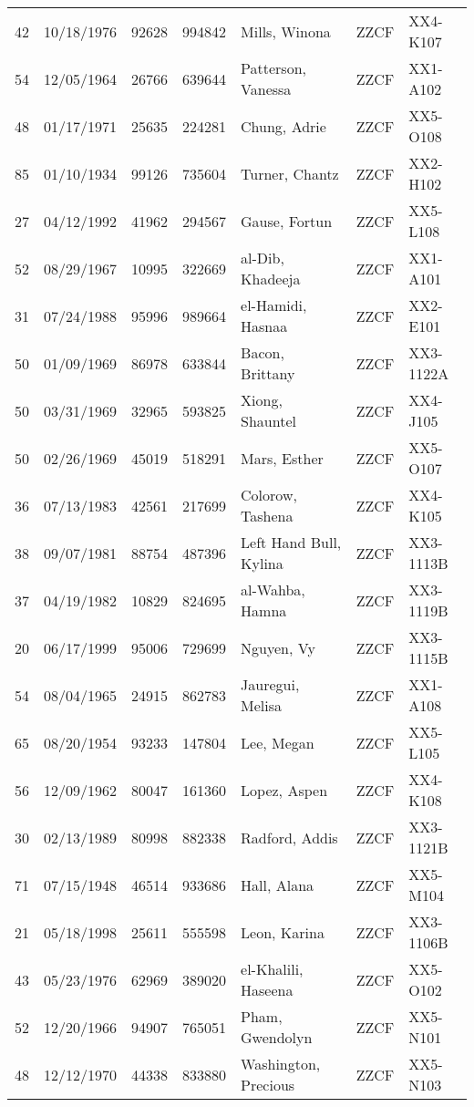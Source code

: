 \documentclass[]{article}
\begin{document}
\begin{tabular}{cccclll}
   42 & 10/18/1976 & 92628 & 994842 & Mills, Winona & ZZCF & XX4-K107 \\ 
   54 & 12/05/1964 & 26766 & 639644 & Patterson, Vanessa & ZZCF & XX1-A102 \\ 
   48 & 01/17/1971 & 25635 & 224281 & Chung, Adrie & ZZCF & XX5-O108 \\ 
   85 & 01/10/1934 & 99126 & 735604 & Turner, Chantz & ZZCF & XX2-H102 \\ 
   27 & 04/12/1992 & 41962 & 294567 & Gause, Fortun & ZZCF & XX5-L108 \\ 
   52 & 08/29/1967 & 10995 & 322669 & al-Dib, Khadeeja & ZZCF & XX1-A101 \\ 
   31 & 07/24/1988 & 95996 & 989664 & el-Hamidi, Hasnaa & ZZCF & XX2-E101 \\ 
   50 & 01/09/1969 & 86978 & 633844 & Bacon, Brittany & ZZCF & XX3-1122A \\ 
   50 & 03/31/1969 & 32965 & 593825 & Xiong, Shauntel & ZZCF & XX4-J105 \\ 
   50 & 02/26/1969 & 45019 & 518291 & Mars, Esther & ZZCF & XX5-O107 \\ 
   36 & 07/13/1983 & 42561 & 217699 & Colorow, Tashena & ZZCF & XX4-K105 \\ 
   38 & 09/07/1981 & 88754 & 487396 & Left Hand Bull, Kylina & ZZCF & XX3-1113B \\ 
   37 & 04/19/1982 & 10829 & 824695 & al-Wahba, Hamna & ZZCF & XX3-1119B \\ 
   20 & 06/17/1999 & 95006 & 729699 & Nguyen, Vy & ZZCF & XX3-1115B \\ 
   54 & 08/04/1965 & 24915 & 862783 & Jauregui, Melisa & ZZCF & XX1-A108 \\ 
   65 & 08/20/1954 & 93233 & 147804 & Lee, Megan & ZZCF & XX5-L105 \\ 
   56 & 12/09/1962 & 80047 & 161360 & Lopez, Aspen & ZZCF & XX4-K108 \\ 
   30 & 02/13/1989 & 80998 & 882338 & Radford, Addis & ZZCF & XX3-1121B \\ 
   71 & 07/15/1948 & 46514 & 933686 & Hall, Alana & ZZCF & XX5-M104 \\ 
   21 & 05/18/1998 & 25611 & 555598 & Leon, Karina & ZZCF & XX3-1106B \\ 
   43 & 05/23/1976 & 62969 & 389020 & el-Khalili, Haseena & ZZCF & XX5-O102 \\ 
   52 & 12/20/1966 & 94907 & 765051 & Pham, Gwendolyn & ZZCF & XX5-N101 \\ 
   48 & 12/12/1970 & 44338 & 833880 & Washington, Precious & ZZCF & XX5-N103 \\ 

\end{tabular}
\end{document}
